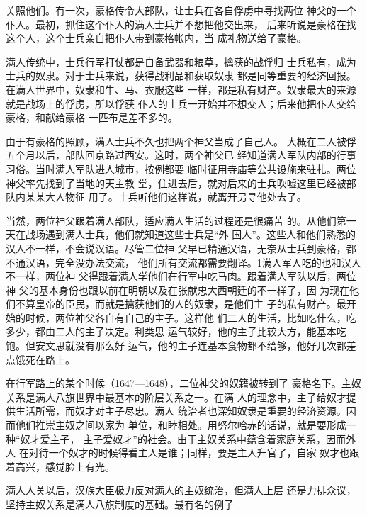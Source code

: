 关照他们。有一次，豪格传令大部队，让士兵在各自俘虏中寻找两位%
神父的一个仆人。最初，抓住这个仆人的满人士兵并不想把他交出来，%
后来听说是豪格在找这个人，这个士兵亲自把仆人带到豪格帐内，当%
成礼物送给了豪格。%
\par
满人传统中，士兵行军打仗都是自备武器和粮草，擒获的战俘归%
士兵私有，成为士兵的奴隶。对于士兵来说，获得战利品和获取奴隶%
都是同等重要的经济回报。在满人世界中，奴隶和牛、马、衣服这些%
一样，都是私有财产。奴隶最大的来源就是战场上的俘虏，所以俘获%
仆人的士兵一开始并不想交人；后来他把仆人交给豪格，和献给豪格%
一匹布是差不多的。%
\par
由于有豪格的照顾，满人士兵不久也把两个神父当成了自己人。%
大概在二人被俘五个月以后，部队回京路过西安。这时，两个神父已%
经知道满人军队内部的行事习俗。当时满人军队进人城市，按例都要%
临时征用寺庙等公共设施来驻扎。两位神父率先找到了当地的天主教%
堂，住进去后，就对后来的士兵吹嘘这里已经被部队内某某大人物征%
用了。士兵听他们这样说，就离开另寻他处去了。%
\par
当然，两位神父跟着满人部队，适应满人生活的过程还是很痛苦%
的。从他们第一天在战场遇到满人士兵，他们就知道这些士兵是“外%
国人”。这些人和他们熟悉的汉人不一样，不会说汉语。尽管二位神%
父早已精通汉语，无奈从士兵到豪格，都不通汉语，完全没办法交流，%
他们所有交流都需要翻译。1满人军人吃的也和汉人不一样，两位神%
父得跟着满人学他们在行军中吃马肉。跟着满人军队以后，两位神%
父的基本身份也跟以前在明朝以及在张献忠大西朝廷的不一样了，因%
为现在他们不算皇帝的臣民，而就是擒获他们的人的奴隶，是他们主%
子的私有财产。最开始的时候，两位神父各自有自己的主子。这样他%
们二人的生活，比如吃什么，吃多少，都由二人的主子决定。利类思%
运气较好，他的主子比较大方，能基本吃饱。但安文思就没有那么好%
运气，他的主子连基本食物都不给够，他好几次都差点饿死在路上。%
\par
在行军路上的某个时候（1647—1648），二位神父的奴籍被转到了%
豪格名下。主奴关系是满人八旗世界中最基本的阶层关系之一。在满%
人的理念中，主子给奴才提供生活所需，而奴才对主子尽忠。满人%
统治者也深知奴隶是重要的经济资源。因而他们推崇主奴之间以家为%
单位，和睦相处。用努尔哈赤的话说，就是要形成一种“奴才爱主子，%
主子爱奴才”的社会。由于主奴关系中蕴含着家庭关系，因而外人%
在对待一个奴才的时候得看主人是谁；同样，要是主人升官了，自家%
奴才也跟着高兴，感觉脸上有光。%
\par
满人人关以后，汉族大臣极力反对满人的主奴统治，但满人上层%
还是力排众议，坚持主奴关系是满人八旗制度的基础。最有名的例子%
